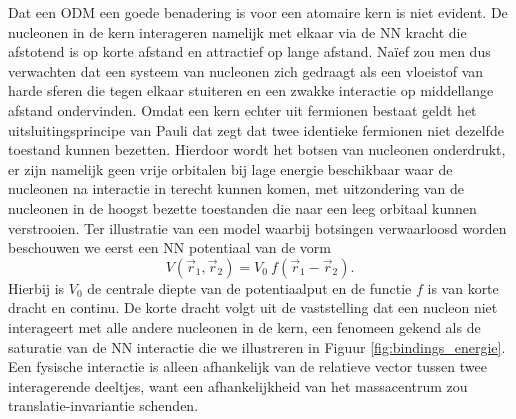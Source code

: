 \documentclass[11pt,twoside]{book}
\begin{document}
Dat een ODM een goede benadering is voor een atomaire kern is niet evident. De nucleonen in de kern interageren namelijk met elkaar via de NN kracht die afstotend is op korte afstand en attractief op lange afstand. Na\"{i}ef zou men dus verwachten dat een systeem van nucleonen zich gedraagt als een vloeistof van harde sferen die tegen elkaar stuiteren en een zwakke interactie op middellange afstand ondervinden. Omdat een kern echter uit fermionen bestaat geldt het uitsluitingsprincipe van Pauli dat zegt dat twee identieke fermionen niet dezelfde toestand kunnen bezetten. Hierdoor wordt het botsen van nucleonen onderdrukt, er zijn namelijk geen vrije orbitalen bij lage energie beschikbaar waar de nucleonen na interactie in terecht kunnen komen, met uitzondering van de nucleonen in de hoogst bezette toestanden die naar een leeg orbitaal kunnen verstrooien. Ter illustratie van een model waarbij botsingen verwaarloosd worden beschouwen we eerst een NN potentiaal van de vorm
\begin{equation}
V(\vec{r}_1, \vec{r}_2) = V_0 \  f(\vec{r}_1 - \vec{r}_2).
\end{equation}
Hierbij is $V_0$ de centrale diepte van de potentiaalput en de functie $f$ is van korte dracht en continu. De korte dracht volgt uit de vaststelling dat een nucleon niet interageert met alle andere nucleonen in de kern, een fenomeen gekend als de saturatie van de NN interactie die we illustreren in Figuur \ref{fig:bindings_energie}. Een fysische interactie is alleen afhankelijk van de relatieve vector tussen twee interagerende deeltjes, want een afhankelijkheid van het massacentrum zou translatie-invariantie schenden.
\end{document}
